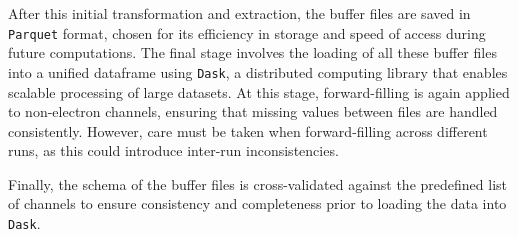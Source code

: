 After this initial transformation and extraction, the buffer files are saved in \texttt{Parquet} format, chosen for its efficiency in storage and speed of access during future computations. The final stage involves the loading of all these buffer files into a unified dataframe using \texttt{Dask}, a distributed computing library that enables scalable processing of large datasets. At this stage, forward-filling is again applied to non-electron channels, ensuring that missing values between files are handled consistently. However, care must be taken when forward-filling across different runs, as this could introduce inter-run inconsistencies.

Finally, the schema of the buffer files is cross-validated against the predefined list of channels to ensure consistency and completeness prior to loading the data into \texttt{Dask}.





